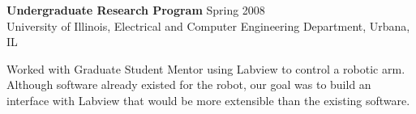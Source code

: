\begin{samepage}
\textbf{Undergraduate Research Program} \hfill Spring 2008 \\
University of Illinois, Electrical and Computer Engineering 
Department, Urbana, IL\\

\begin{description}  \itemsep -2pt %
\item Worked with Graduate Student Mentor using Labview
to control a robotic arm. Although software already existed
for the robot, our goal was to build an interface with
Labview that would be more extensible than the existing software.
\end{description}
\end{samepage}
